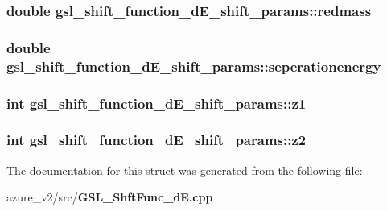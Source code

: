 \subsubsection{\setlength{\rightskip}{0pt plus 5cm}double \bf{gsl\_\-shift\_\-function\_\-d\-E\_\-shift\_\-params::redmass}}\label{structgsl__shift__function__dE__shift__params_5b2d3250f85eab84b4c209121c4d98d3}


\subsubsection{\setlength{\rightskip}{0pt plus 5cm}double \bf{gsl\_\-shift\_\-function\_\-d\-E\_\-shift\_\-params::seperationenergy}}\label{structgsl__shift__function__dE__shift__params_4bb511545b14e75a10c1c9d9615f6744}


\subsubsection{\setlength{\rightskip}{0pt plus 5cm}int \bf{gsl\_\-shift\_\-function\_\-d\-E\_\-shift\_\-params::z1}}\label{structgsl__shift__function__dE__shift__params_1cb4e3b17f276608b25093ac9b28bf6e}


\subsubsection{\setlength{\rightskip}{0pt plus 5cm}int \bf{gsl\_\-shift\_\-function\_\-d\-E\_\-shift\_\-params::z2}}\label{structgsl__shift__function__dE__shift__params_3b393fab07d389b46e4d82cf0e9f5c9e}




The documentation for this struct was generated from the following file:\begin{CompactItemize}
\item 
azure\_\-v2/src/\bf{GSL\_\-Shft\-Func\_\-d\-E.cpp}\end{CompactItemize}
